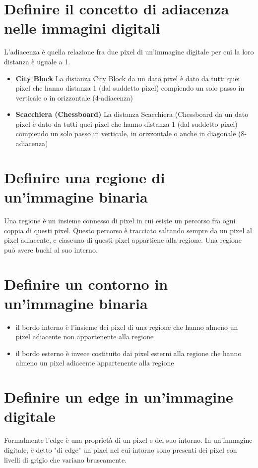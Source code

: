 \section{Definire il concetto di adiacenza nelle immagini digitali}
L'adiacenza è quella relazione fra due pixel di un'immagine digitale per cui la loro distanza è uguale a 1. 
\begin{itemize}

	\item \textbf{City Block}
	La distanza City Block da un dato pixel è dato da tutti quei pixel che hanno distanza 1 (dal suddetto pixel) compiendo un solo passo in verticale o in orizzontale
(4-adiacenza)

	\item \textbf{Scacchiera (Chessboard)}
	La distanza Scacchiera (Chessboard da un dato pixel è dato da tutti quei pixel che hanno distanza 1 (dal suddetto pixel) compiendo un solo passo in verticale, in orizzontale o anche in diagonale (8-adiacenza)
\end{itemize}

\section{Definire una regione di un'immagine binaria}
Una regione è un insieme connesso di pixel in cui esiste un percorso fra ogni coppia di questi pixel. Questo percorso è tracciato saltando sempre da un pixel al pixel adiacente, e ciascuno di questi pixel appartiene alla regione.
Una regione può avere buchi al suo interno.

\section{Definire un contorno in un'immagine binaria}
\begin{itemize}
	\item il bordo interno è l'insieme dei pixel di una regione che hanno almeno un pixel adiacente non	appartenente alla regione
	\item il bordo esterno è invece costituito dai pixel esterni alla regione che hanno almeno un pixel adiacente appartenente alla regione
\end{itemize}

\section{Definire un edge in un'immagine digitale}
Formalmente l'edge è una proprietà di un pixel e del suo intorno. In un'immagine digitale, è detto "di edge" un pixel nel cui intorno sono presenti dei pixel con livelli di grigio che variano bruscamente.

